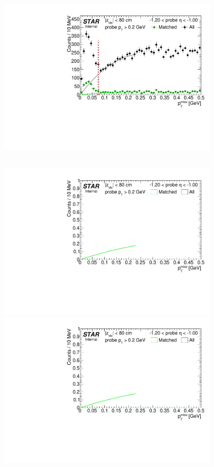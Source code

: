 \begin{figure}[ht]
{  \includegraphics[width=\linewidth,page=10]{graphics/systematicsEfficiency/TOF_tagAndProbe/Fitting_effVsEta_data.pdf}
}~
\parbox{0.495\textwidth}{
  \centering
  \includegraphics[width=\linewidth,page=7]{graphics/systematicsEfficiency/TOF_tagAndProbe/Fitting_effVsEta_mc.pdf}\\
  \includegraphics[width=\linewidth,page=8]{graphics/systematicsEfficiency/TOF_tagAndProbe/Fitting_effVsEta_mc.pdf}\\
}
\end{figure}
